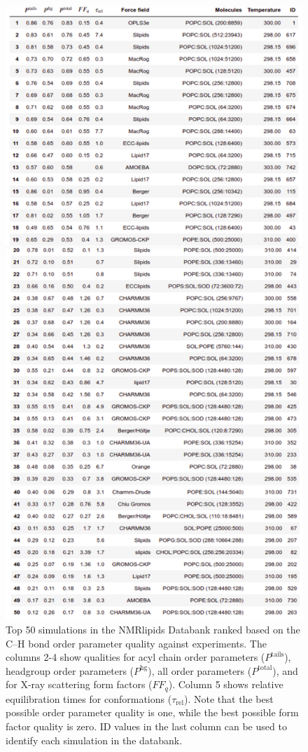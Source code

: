 \documentclass[fleqn,10pt]{wlscirepSI}
\begin{document}
\begin{figure}[!h]
    \centering
    \includegraphics[height = 0.8\textheight]{Figures/totalrankingCOMPL.pdf}
    \caption{Top 50 simulations in the NMRlipids Databank ranked based on the C--H bond order parameter quality against experiments. The columns 2-4 show qualities for acyl chain order parameters ($P^\mathrm{tails}$), headgroup order parameters ($P^\mathrm{hg}$), all order parameters ($P^\mathrm{total}$), and for X-ray scattering form factors ($FF_q$). Column 5 shows relative equilibration times for conformations ($\tau_\mathrm{rel}$). Note that the best possible order parameter quality is one, while the best possible form factor quality is zero. ID values in the last column can be used to identify each simulation in the databank.}
    \label{fig:top50simulations}
\end{figure}
\end{document}
